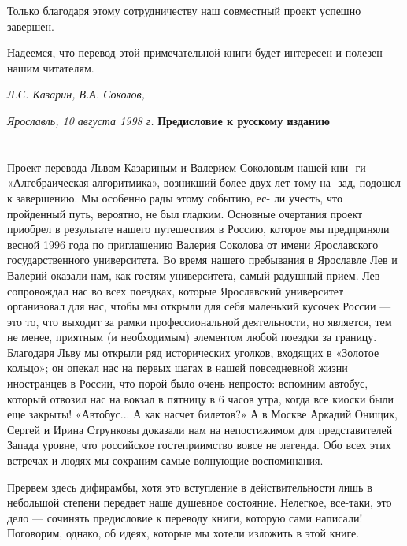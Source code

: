\documentclass{mai_book}
\begin{document}
{{   Только благодаря этому сотрудничеству наш совместный проект успешно завершен.
   
   Надеемся, что перевод этой примечательной книги будет интересен и полезен нашим читателям.


 \hspace{3.1in} \textit {Л.С. Казарин, В.А. Соколов,} 
   
\hspace{3.0in} \textit {Ярославль, 10 августа 1998 г.}
\newpage
\hspace{1.4cm} {\Large \textbf {Предисловие к русскому изданию}}
\newline\\
\hspace*{15pt}
\hspace*{15pt}
\\\\
Проект перевода Львом Казариным и Валерием Соколовым нашей кни-
ги «Алгебраическая алгоритмика», возникший более двух лет тому на-
зад, подошел к завершению. Мы особенно рады этому событию, ес-
ли учесть, что пройденный путь, вероятно, не был гладким. Основные очертания проект приобрел в результате нашего путешествия в Россию, которое мы предприняли весной 1996 года по приглашению Валерия Соколова от имени Ярославского государственного университета. Во время нашего пребывания в Ярославле Лев и Валерий оказали нам, как гостям университета, самый радушный прием. Лев сопровождал нас во всех поездках, которые Ярославский университет организовал для нас, чтобы мы открыли для себя маленький кусочек России — это то, что выходит за рамки профессиональной деятельности, но является, тем не менее, приятным (и необходимым) элементом любой поездки за границу. Благодаря Льву мы открыли ряд исторических уголков, входящих в «Золотое кольцо»; он опекал нас на первых шагах в нашей повседневной жизни иностранцев в России, что порой было очень непросто: вспомним автобус, который отвозил нас на вокзал в пятницу в 6 часов утра, когда все киоски были еще закрыты! «Автобус... А как насчет билетов?» А в Москве Аркадий Онищик, Сергей и Ирина Струнковы доказали нам на непостижимом для представителей Запада уровне, что российское гостеприимство вовсе не легенда. Обо всех этих встречах и людях мы сохраним самые волнующие воспоминания.

   Прервем здесь дифирамбы, хотя это вступление в действительности лишь в небольшой степени передает наше душевное состояние. Нелегкое, все-таки, это дело — сочинять предисловие к переводу книги, которую сами написали! Поговорим, однако, об идеях, которые мы хотели изложить в этой книге.

}}
\end{document}
